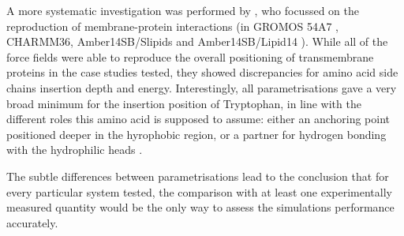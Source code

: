 A more systematic investigation was performed by \citet{Sandoval-Perez2017}, who focussed on the reproduction of membrane-protein interactions (in GROMOS 54A7 \citep{Schmid2011}, CHARMM36, Amber14SB/Slipids \citep{Jambeck2012} and Amber14SB/Lipid14 \citep{Dickson2014}).
%
While all of the force fields were able to reproduce the overall positioning of transmembrane proteins in the case studies tested, they showed discrepancies for amino acid side chains insertion depth and energy.
%
Interestingly, all parametrisations gave a very broad minimum for the insertion position of Tryptophan, in line with the different roles this amino acid is supposed to assume: either an anchoring point positioned deeper in the hyrophobic region, or a partner for hydrogen bonding with the hydrophilic heads \citep{Chan2006}.

The subtle differences between parametrisations lead to the conclusion that for every particular system tested, the comparison with at least one experimentally measured quantity would be the only way to assess the simulations performance accurately.

